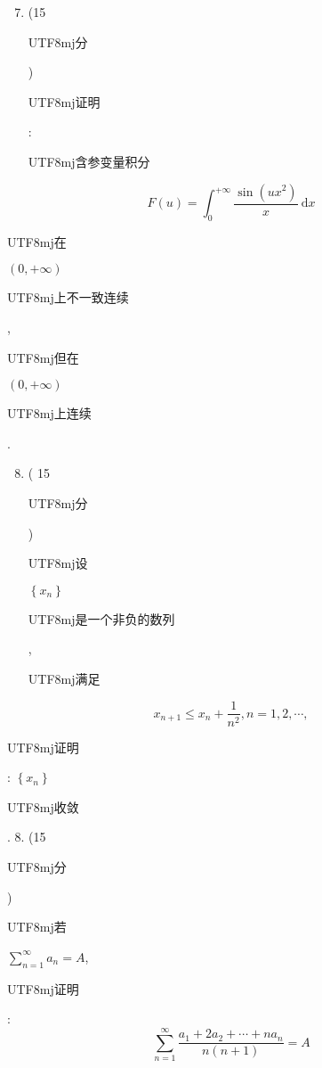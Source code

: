 \documentclass[10pt]{article}
\begin{document}
\begin{enumerate}
  \setcounter{enumi}{6}
  \item (15 \begin{CJK}{UTF8}{mj}分\end{CJK}) \begin{CJK}{UTF8}{mj}证明\end{CJK}: \begin{CJK}{UTF8}{mj}含参变量积分\end{CJK}
\end{enumerate}
$$
F(u)=\int_{0}^{+\infty} \frac{\sin \left(u x^{2}\right)}{x} \mathrm{~d} x
$$
\begin{CJK}{UTF8}{mj}在\end{CJK} $(0,+\infty)$ \begin{CJK}{UTF8}{mj}上不一致连续\end{CJK}, \begin{CJK}{UTF8}{mj}但在\end{CJK} $(0,+\infty)$ \begin{CJK}{UTF8}{mj}上连续\end{CJK}.

\begin{enumerate}
  \setcounter{enumi}{7}
  \item ( 15 \begin{CJK}{UTF8}{mj}分\end{CJK}) \begin{CJK}{UTF8}{mj}设\end{CJK} $\left\{x_{n}\right\}$ \begin{CJK}{UTF8}{mj}是一个非负的数列\end{CJK}, \begin{CJK}{UTF8}{mj}满足\end{CJK}
\end{enumerate}
$$
x_{n+1} \leqslant x_{n}+\frac{1}{n^{2}}, n=1,2, \cdots,
$$
\begin{CJK}{UTF8}{mj}证明\end{CJK}: $\left\{x_{n}\right\}$ \begin{CJK}{UTF8}{mj}收敛\end{CJK}. 8. (15 \begin{CJK}{UTF8}{mj}分\end{CJK}) \begin{CJK}{UTF8}{mj}若\end{CJK} $\sum_{n=1}^{\infty} a_{n}=A$, \begin{CJK}{UTF8}{mj}证明\end{CJK}:
$$
\sum_{n=1}^{\infty} \frac{a_{1}+2 a_{2}+\cdots+n a_{n}}{n(n+1)}=A
$$
\end{document}
